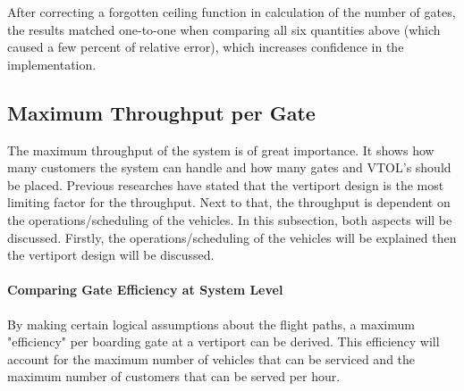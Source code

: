 After correcting a forgotten ceiling function in calculation of the number of gates, the results matched one-to-one when comparing all six quantities above (which caused a few percent of relative error), which increases confidence in the implementation.













\subsection{Maximum Throughput per Gate} \label{subsec:GateThroughput}
The maximum throughput of the system is of great importance. It shows how many customers the system can handle and how many gates and VTOL's should be placed. Previous researches have stated that the vertiport design is the most limiting factor for the throughput. Next to that, the throughput is dependent on the operations/scheduling of the vehicles. In this subsection, both aspects will be discussed. Firstly, the operations/scheduling of the vehicles will be explained then the vertiport design will be discussed.

\paragraph{Comparing Gate Efficiency at System Level}
By making certain logical assumptions about the flight paths, a maximum "efficiency" per boarding gate at a vertiport can be derived. This efficiency will account for the maximum number of vehicles that can be serviced and the maximum number of customers that can be served per hour.

